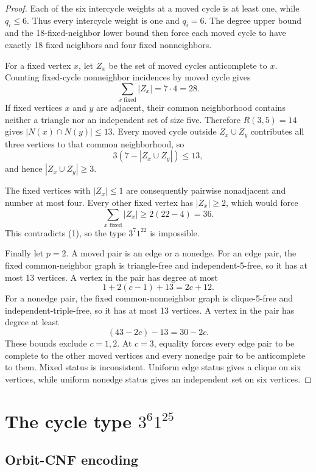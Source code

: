 \documentclass[11pt]{article}
\begin{document}
\begin{proof}
Each of the six intercycle weights at a moved cycle is at least one, while
$q_i\le6$. Thus every intercycle weight is one and $q_i=6$. The degree upper
bound and the 18-fixed-neighbor lower bound then force each moved cycle to
have exactly 18 fixed neighbors and four fixed nonneighbors.

For a fixed vertex $x$, let $Z_x$ be the set of moved cycles anticomplete to
$x$. Counting fixed-cycle nonneighbor incidences by moved cycle gives
\[
\sum_{x\text{ fixed}}|Z_x|=7\cdot4=28. \tag{1}
\]
If fixed vertices $x$ and $y$ are adjacent, their common neighborhood
contains neither a triangle nor an independent set of size five. Therefore
$R(3,5)=14$ gives $|N(x)\cap N(y)|\le13$. Every moved cycle outside
$Z_x\cup Z_y$ contributes all three vertices to that common neighborhood,
so
\[
3(7-|Z_x\cup Z_y|)\le13,
\]
and hence $|Z_x\cup Z_y|\ge3$.

The fixed vertices with $|Z_x|\le1$ are consequently pairwise nonadjacent
and number at most four. Every other fixed vertex has $|Z_x|\ge2$, which
would force
\[
\sum_{x\text{ fixed}}|Z_x|\ge2(22-4)=36.
\]
This contradicts (1), so the type $3^7 1^{22}$ is impossible.

Finally let $p=2$. A moved pair is an edge or a nonedge. For an edge pair,
the fixed common-neighbor graph is triangle-free and independent-5-free, so
it has at most 13 vertices. A vertex in the pair has degree at most
\[
1+2(c-1)+13=2c+12.
\]
For a nonedge pair, the fixed common-nonneighbor graph is clique-5-free and
independent-triple-free, so it has at most 13 vertices. A vertex in the pair
has degree at least
\[
(43-2c)-13=30-2c.
\]
These bounds exclude $c=1,2$. At $c=3$, equality forces every edge pair to
be complete to the other moved vertices and every nonedge pair to be
anticomplete to them. Mixed status is inconsistent. Uniform edge status
gives a clique on six vertices, while uniform nonedge status gives an
independent set on six vertices.
\end{proof}

\section{\texorpdfstring{The cycle type $3^6 1^{25}$}
{The cycle type 3\string^6 1\string^25}}

\subsection{Orbit-CNF encoding}
\end{document}
